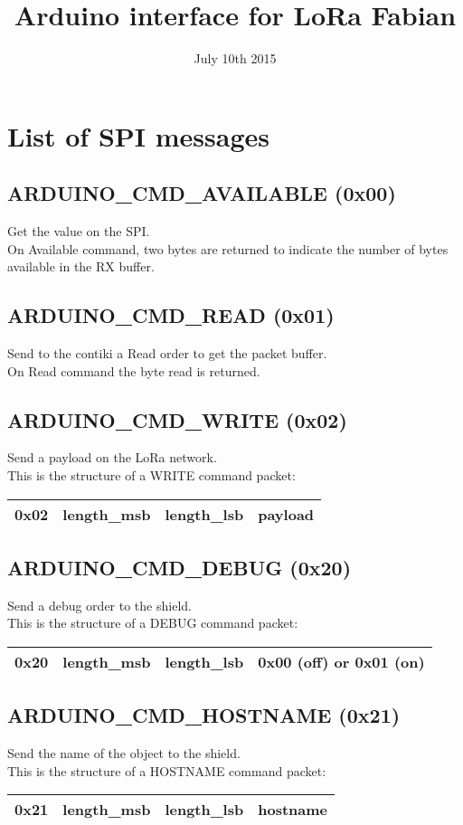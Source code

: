 \documentclass{article}
\title{Arduino interface for LoRa Fabian}
\date{July 10th 2015}
\begin{document}
\maketitle

\tableofcontents

\section{List of SPI messages}
\subsection{ARDUINO\_CMD\_AVAILABLE (0x00)}
Get the value on the SPI.\\
On Available command, two bytes are returned to indicate the number of bytes
available in the RX buffer.
\subsection{ARDUINO\_CMD\_READ (0x01)}
Send to the contiki a Read order to get the packet buffer.\\
On Read command the byte read is returned.
\subsection{ARDUINO\_CMD\_WRITE (0x02)}
Send a payload on the LoRa network.\\
This is the structure of a WRITE command packet:
\begin{tabular}{|c|c|c|c|}
\hline
0x02 & length\_msb & length\_lsb & payload\\
\hline
\end{tabular}
\subsection{ARDUINO\_CMD\_DEBUG (0x20)}
Send a debug order to the shield.\\
This is the structure of a DEBUG command packet:
\begin{tabular}{|c|c|c|c|}
\hline
0x20 & length\_msb & length\_lsb & 0x00 (off) or 0x01 (on)\\
\hline
\end{tabular}
\subsection{ARDUINO\_CMD\_HOSTNAME (0x21)}
Send the name of the object to the shield.\\
This is the structure of a HOSTNAME command packet:
\begin{tabular}{|c|c|c|c|}
\hline
0x21 & length\_msb & length\_lsb & hostname\\
\hline
\end{tabular}
\end{document}

